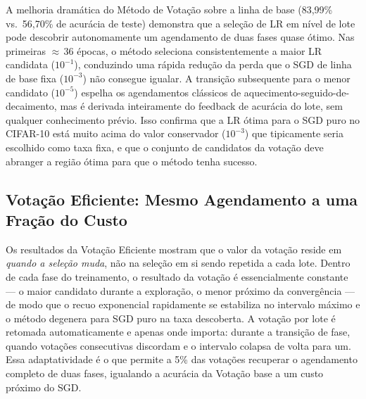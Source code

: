 \documentclass[conference]{IEEEtran}
\begin{document}
A melhoria dramática do Método de Votação sobre a linha de base (83,99\% vs.\ 56,70\% de acurácia de teste) demonstra que a seleção de LR em nível de lote pode descobrir autonomamente um agendamento de duas fases quase ótimo. Nas primeiras ${\approx}\,36$ épocas, o método seleciona consistentemente a maior LR candidata ($10^{-1}$), conduzindo uma rápida redução da perda que o SGD de linha de base fixa ($10^{-3}$) não consegue igualar. A transição subsequente para o menor candidato ($10^{-5}$) espelha os agendamentos clássicos de aquecimento-seguido-de-decaimento, mas é derivada inteiramente do feedback de acurácia do lote, sem qualquer conhecimento prévio. Isso confirma que a LR ótima para o SGD puro no CIFAR-10 está muito acima do valor conservador ($10^{-3}$) que tipicamente seria escolhido como taxa fixa, e que o conjunto de candidatos da votação deve abranger a região ótima para que o método tenha sucesso.

\subsection{Votação Eficiente: Mesmo Agendamento a uma Fração do Custo}

Os resultados da Votação Eficiente mostram que o valor da votação reside em \emph{quando a seleção muda}, não na seleção em si sendo repetida a cada lote. Dentro de cada fase do treinamento, o resultado da votação é essencialmente constante --- o maior candidato durante a exploração, o menor próximo da convergência --- de modo que o recuo exponencial rapidamente se estabiliza no intervalo máximo e o método degenera para SGD puro na taxa descoberta. A votação por lote é retomada automaticamente e apenas onde importa: durante a transição de fase, quando votações consecutivas discordam e o intervalo colapsa de volta para um. Essa adaptatividade é o que permite a 5\% das votações recuperar o agendamento completo de duas fases, igualando a acurácia da Votação base a um custo próximo do SGD.
\end{document}
